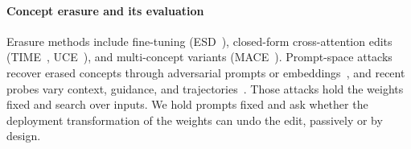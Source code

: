 \paragraph{Concept erasure and its evaluation}
Erasure methods include fine-tuning (ESD~\cite{esd}), closed-form cross-attention
edits (TIME~\cite{time}, UCE~\cite{uce}), and multi-concept variants
(MACE~\cite{mace}). Prompt-space attacks recover erased concepts through adversarial
prompts or embeddings~\cite{pham2023,ringabell,unlearndiffatk}, and recent probes
vary context, guidance, and trajectories~\cite{lu2025}. Those attacks hold the
weights fixed and search over inputs. We hold prompts fixed and ask whether the
deployment transformation of the weights can undo the edit, passively or by design.
